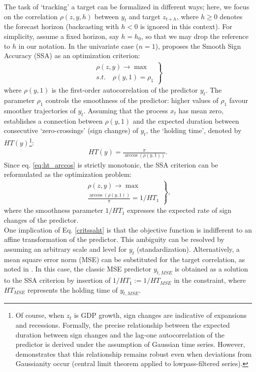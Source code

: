 \documentclass[11pt,a4paper]{article}
\begin{document}
The task of `tracking' a target can be formalized in different ways; here, we focus on the correlation $\rho(z,y,h)$ between $y_t$ and target $z_{t+h}$, where $h\geq 0$ denotes the forecast horizon (backcasting with $h<0$ is ignored in this context). For simplicity, assume a fixed horizon, say $h=h_0$, so that we may drop the reference to $h$ in our notation. In the univariate case ($n=1$), \cite{Wildi2025} proposes the Smooth Sign Accuracy (SSA) as an optimization criterion:
\begin{eqnarray}\label{critssa}
\left.\begin{array}{c}\rho(z,y)\to\max\\
s.t. \quad \rho(y,1)=\rho_1\end{array}\right\}
\end{eqnarray}
where $\rho(y,1)$ is the first-order autocorrelation of the predictor $y_t$. The parameter $\rho_1$ controls the smoothness of the predictor: higher values of $\rho_1$ favour smoother trajectories of $y_t$. Assuming that the process $x_t$ has mean zero, \cite{Wildi2024} establishes a connection between $\rho(y,1)$ and the expected duration between consecutive `zero-crossings' (sign changes) of $y_t$, the `holding time', denoted by $HT(y)$\footnote{Of course, when $z_t$ is GDP growth, sign changes are indicative of expansions and recessions. Formally, the precise relationship between the expected duration between sign changes and the lag-one autocorrelation of the predictor is derived under the assumption of Gaussian time series. However, \cite{Wildi2024} demonstrates that this relationship remains robust even when deviations from Gaussianity occur (central limit theorem applied to lowpass-filtered series).}:
\begin{eqnarray}\label{ht}
HT(y)=\frac{\pi}{\arccos(\rho(y,1))}.
\label{eq:ht_arccos}
\end{eqnarray}
Since eq. \ref{eq:ht_arccos} is strictly monotonic, the SSA criterion can be reformulated as the optimization problem:
\begin{eqnarray}\label{critssaht}
\left.\begin{array}{c}\rho(z,y)\to\max\\
\frac{\arccos(\rho(y,1))}{\pi}=1/HT_1\end{array}\right\},
\end{eqnarray}
where the smoothness parameter $1/HT_1$ expresses the expected rate of sign changes of the predictor. \\


One implication of Eq. \eqref{critssaht} is that the objective function is indifferent to an affine transformation of the predictor. This ambiguity can be resolved by assuming an arbitrary scale and level for $y_t$ (standardization). Alternatively, a mean square error norm (MSE) can be substituted for the target correlation, as noted in \cite{Wildi2025}. In this case, the classic MSE predictor $y_{t,MSE}$ is obtained as a solution to the SSA criterion by insertion of $1/HT_1:=1/HT_{MSE}$ in the constraint, where $HT_{MSE}$ represents the holding time of $y_{t,MSE}$. %
\end{document}

